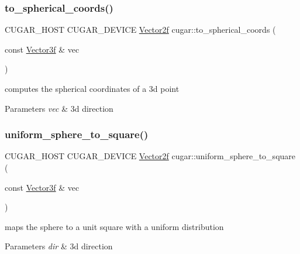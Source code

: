 \subsubsection{\texorpdfstring{to\+\_\+spherical\+\_\+coords()}{to\_spherical\_coords()}}
{\footnotesize\ttfamily C\+U\+G\+A\+R\+\_\+\+H\+O\+ST C\+U\+G\+A\+R\+\_\+\+D\+E\+V\+I\+CE \hyperlink{structcugar_1_1_vector}{Vector2f} cugar\+::to\+\_\+spherical\+\_\+coords (\begin{DoxyParamCaption}\item[{const \hyperlink{structcugar_1_1_vector}{Vector3f} \&}]{vec }\end{DoxyParamCaption})\hspace{0.3cm}{\ttfamily [inline]}}

computes the spherical coordinates of a 3d point


\begin{DoxyParams}{Parameters}
{\em vec} & 3d direction \\
\hline
\end{DoxyParams}
\mbox{\label{group__spherical__mappings_gaf091547e7d69c8125c7b037aa2d5bd5c}} 
\subsubsection{\texorpdfstring{uniform\+\_\+sphere\+\_\+to\+\_\+square()}{uniform\_sphere\_to\_square()}}
{\footnotesize\ttfamily C\+U\+G\+A\+R\+\_\+\+H\+O\+ST C\+U\+G\+A\+R\+\_\+\+D\+E\+V\+I\+CE \hyperlink{structcugar_1_1_vector}{Vector2f} cugar\+::uniform\+\_\+sphere\+\_\+to\+\_\+square (\begin{DoxyParamCaption}\item[{const \hyperlink{structcugar_1_1_vector}{Vector3f} \&}]{vec }\end{DoxyParamCaption})\hspace{0.3cm}{\ttfamily [inline]}}

maps the sphere to a unit square with a uniform distribution


\begin{DoxyParams}{Parameters}
{\em dir} & 3d direction \\
\hline
\end{DoxyParams}
\mbox{\label{group__spherical__mappings_gae75ef450df309874ff133b4ec8daee40}} 
